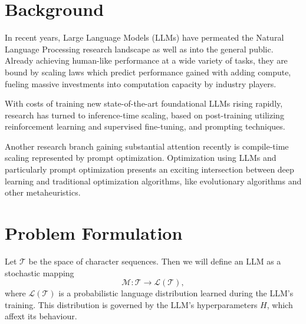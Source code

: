 \section{Background}
In recent years, Large Language Models (LLMs) have permeated the Natural Language Processing research landscape as well as into the general public. 
Already achieving human-like performance at a wide variety of tasks\cite{bubeck2023sparksartificialgeneralintelligence}, 
they are bound by scaling laws\cite{kaplan2020scalinglawsneurallanguage} which predict performance gained with adding compute, fueling
massive investments into computation capacity by industry players. 

With costs of training new state-of-the-art foundational LLMs rising rapidly, research has turned to inference-time scaling\cite{welleck2024decodingmetagenerationinferencetimealgorithms}, 
based on post-training\cite{openai2024openaio1card}\cite{deepseekai2025deepseekr1incentivizingreasoningcapability} utilizing reinforcement learning and supervised fine-tuning, and 
prompting techniques\cite{schulhoff2024promptreportsystematicsurvey}. 

Another research branch gaining substantial attention recently is compile-time scaling\cite{schnabel2024symbolicpromptprogramsearch} represented by prompt optimization\cite{ramnath2025systematicsurveyautomaticprompt}.
Optimization using LLMs\cite{meyerson2024languagemodelcrossovervariation}\cite{liu2024largelanguagemodelsevolutionary} and particularly prompt optimization\cite{yang2024largelanguagemodelsoptimizers}\cite{zhou2023largelanguagemodelshumanlevel}\cite{he2024crispomultiaspectcritiquesuggestionguidedautomatic} 
presents an exciting intersection between deep learning and traditional optimization algorithms, like evolutionary algorithms\cite{guo2024connectinglargelanguagemodels}\cite{cui2024phaseevounifiedincontextprompt}\cite{fernando2023promptbreederselfreferentialselfimprovementprompt} and other metaheuristics\cite{pan2024plumpromptlearningusing}.

\section{Problem Formulation}\label{sec:notation}
Let $\mathcal{T}$ be the space of character sequences. Then we will define an LLM as a stochastic mapping
\begin{equation}
    \mathscr{M}: \mathcal{T} \rightarrow \mathcal{L}(\mathcal{T}),
\end{equation}
where $\mathcal{L}(\mathcal{T})$ is a probabilistic language distribution learned during the LLM's training.
This distribution is governed by the LLM's hyperparameters $H$, which affext its behaviour. 


